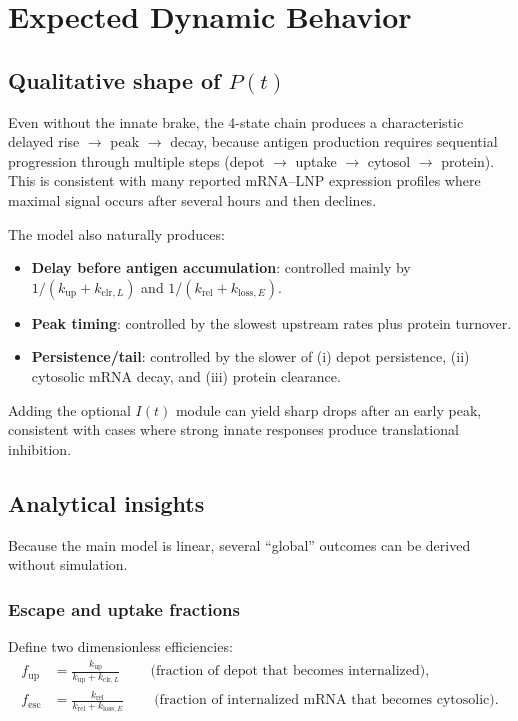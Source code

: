 \section{Expected Dynamic Behavior}

\subsection*{Qualitative shape of $P(t)$}

Even without the innate brake, the 4-state chain produces a characteristic delayed rise $\to$ peak $\to$ decay, because antigen production requires sequential progression through multiple steps (depot $\to$ uptake $\to$ cytosol $\to$ protein). This is consistent with many reported mRNA--LNP expression profiles where maximal signal occurs after several hours and then declines. \parencite{pardi2015expressionKinetics}

The model also naturally produces:
\begin{itemize}
    \item \textbf{Delay before antigen accumulation}: controlled mainly by $1/(k_{\mathrm{up}}+k_{\mathrm{clr},L})$ and $1/(k_{\mathrm{rel}}+k_{\mathrm{loss},E})$.
    \item \textbf{Peak timing}: controlled by the slowest upstream rates plus protein turnover.
    \item \textbf{Persistence/tail}: controlled by the slower of (i) depot persistence, (ii) cytosolic mRNA decay, and (iii) protein clearance.
\end{itemize}

Adding the optional $I(t)$ module can yield sharp drops after an early peak, consistent with cases where strong innate responses produce translational inhibition. \parencite{Huysmans2019saRNALNPSkin}

\subsection*{Analytical insights}

Because the main model is linear, several ``global'' outcomes can be derived without simulation.

\subsubsection*{Escape and uptake fractions}

Define two dimensionless efficiencies:
\begin{align}
 f_{\mathrm{up}} &= \frac{k_{\mathrm{up}}}{k_{\mathrm{up}} + k_{\mathrm{clr},L}} \, \qquad \text{(fraction of depot that becomes internalized)}, \\
 f_{\mathrm{esc}} &= \frac{k_{\mathrm{rel}}}{k_{\mathrm{rel}} + k_{\mathrm{loss},E}} \, \qquad \text{(fraction of internalized mRNA that becomes cytosolic)}.
\end{align}


